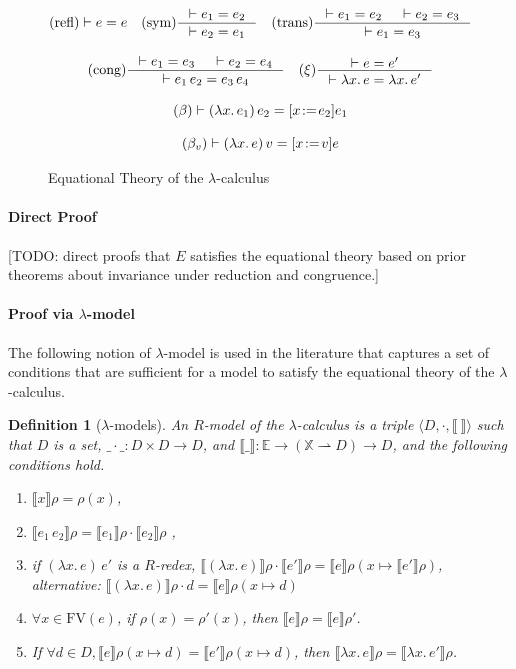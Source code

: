 \documentclass{tufte-handout}
\newcommand{\SEM}[1]{\llbracket #1 \rrbracket}
\newcommand{\LAM}[1]{\lambda #1.\,}
\newcommand{\APP}[0]{\,}
\newcommand{\by}[0]{\!:=\!}
\newcommand{\pto}[0]{\rightharpoonup}
\newcommand{\VAR}[0]{\mathbb{X}}
\newcommand{\ext}[3]{#3(#1{\mapsto}#2)}
\newtheorem{definition}{Definition}%
\begin{document}
\begin{figure}
\begin{gather*}
  \text{(refl)}  \vdash e = e
  \quad
  \text{(sym)}   \inference{\vdash e_1 = e_2}{\vdash e_2 = e_1}  
  \quad
  \text{(trans)}  \inference{\vdash e_1 = e_2 & \vdash e_2 = e_3}{\vdash e_1 = e_3} \\[2ex]
  \text{(cong)}  \inference{\vdash e_1 = e_3 & \vdash e_2 = e_4}
                            {\vdash e_1 \APP e_2 = e_3 \APP e_4}
   \quad
  \text{($\xi$)}  \inference{\vdash e = e'}{\vdash \LAM{x}e = \LAM{x}e'} \\[2ex]
  \text{($\beta$)}  \vdash (\LAM{x}e_1)\APP e_2 = [x\by e_2]e_1 \\[2ex]
  \text{($\beta_v$)}  \vdash (\LAM{x}e)\APP v = [x\by v]e
\end{gather*}
\caption{Equational Theory of the $\lambda$-calculus}
\label{fig:lambda-eq}
\end{figure}


\paragraph{Direct Proof}

[TODO: direct proofs that $E$ satisfies the equational theory based on
  prior theorems about invariance under reduction and congruence.]

\paragraph{Proof via $\lambda$-model}

The following notion of $\lambda$-model is used in the literature that
captures a set of conditions that are sufficient for a model to
satisfy the equational theory of the $\lambda$-calculus.

\begin{definition}[$\lambda$-models]
  An \emph{$R$-model of the $\lambda$-calculus} is a triple $\langle
  D, \cdot, \SEM{\ }\rangle$ such that $D$ is a set, $\_\cdot\_:D \times D
  \to D$, and $\SEM{\_} : \mathbb{E}\to(\VAR\pto D)\to D$, and the
  following conditions hold.
  \begin{enumerate}
  \item $\SEM{ x}\rho = \rho(x)$, \label{cond:var}
  \item $\SEM{e_1\APP e_2}\rho = \SEM{e_1}\rho \cdot \SEM{e_2}\rho$ \label{cond:app},
  \item if $(\LAM{x}e) \APP e'$ is a $R$-redex, $\SEM{(\LAM{x}e)}\rho \cdot \SEM{e'}\rho = \SEM{e}\ext{x}{\SEM{e'}\rho}{\rho}$\label{cond:R}, \\
        alternative: $\SEM{(\LAM{x}e)}\rho \cdot d = \SEM{e}\ext{x}{ d}{\rho}$ \label{cond:lam-app}
  \item $\forall x \in \mathrm{FV}(e)$, if  $\rho(x) = \rho'(x)$,
       then $\SEM{e}\rho = \SEM{e}\rho'$. \label{cond:env}
  \item If $\forall d \in D, \SEM{e}\ext{x}{ d}{\rho} = \SEM{e'}\ext{x}{ d}{\rho}$,
       then $\SEM{\LAM{x} e}\rho = \SEM{\LAM{x} e'}\rho$. \label{cond:lam}
  \end{enumerate}
\end{definition}
\end{document}
